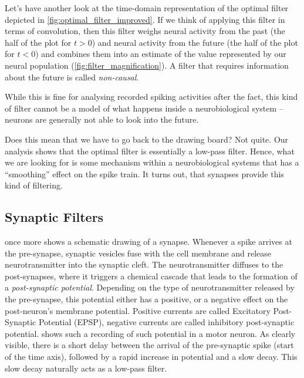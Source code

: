 \documentclass[10pt,letterpaper,oneside]{article}
\begin{document}
Let's have another look at the time-domain representation of the optimal filter depicted in \cref{fig:optimal_filter_improved}. If we think of applying this filter in terms of convolution, then this filter weighs neural activity from the past (the half of the plot for $t > 0$) and neural activity from the future (the half of the plot for $t < 0$) and combines them into an estimate of the value represented by our neural population (\cref{fig:filter_magnification}). A filter that requires information about the future is called \emph{non-causal}.

While this is fine for analysing recorded spiking activities after the fact, this kind of filter cannot be a model of what happens inside a neurobiological system -- neurons are generally not able to look into the future.

Does this mean that we have to go back to the drawing board? Not quite. Our analysis shows that the optimal filter is essentially a low-pass filter. Hence, what we are looking for is some mechanism within a neurobiological systems that has a \enquote{smoothing} effect on the spike train. It turns out, that synapses provide this kind of filtering.

\subsection{Synaptic Filters}

 once more shows a schematic drawing of a synapse. Whenever a spike arrives at the pre-synapse, synaptic vesicles fuse with the cell membrane and release neurotransmitter into the synaptic cleft. The neurotransmitter diffuses to the post-synapses, where it triggers a chemical cascade that leads to the formation of a \emph{post-synaptic potential}. Depending on the type of neurotransmitter released by the pre-synapse, this potential either has a positive, or a negative effect on the post-neuron's membrane potential. Positive currents are called Excitatory Post-Synaptic Potential (EPSP), negative currents are called inhibitory post-synaptic potential.  shows such a recording of such potential in a motor neuron. As clearly visible, there is a short delay between the arrival of the pre-synaptic spike (start of the time axis), followed by a rapid increase in potential and a slow decay. This slow decay naturally acts as a low-pass filter.
\end{document}

